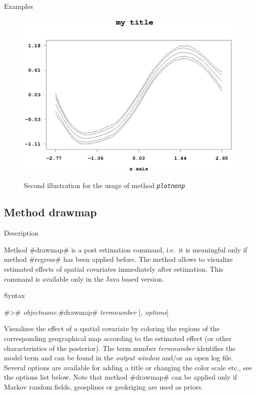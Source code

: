 \begin{stanza}{Examples}
\begin{figure}[p]
\begin{center}
\includegraphics[scale=0.8]{grafiken/plotnonpexample2.ps}
{\em\caption{ \label{plotnonpexample2} Second illustration for the
usage of method \em\tt plotnonp}}
\end{center}
\end{figure}

\end{stanza}

\clearpage

\subsection{Method drawmap} \label{drawmap}

\begin{stanza}{Description}

Method #drawmap# is a post estimation command, i.e.~it is
meaningful only if method #regress# has been applied before. The
method allows to visualize estimated effects of spatial covariates
immediately after estimation. This command is available only in
the Java based version.

\end{stanza}

\begin{stanza}{Syntax}

#># {\em objectname}.#drawmap# {\em termnumber} [{\em , options}]

Visualizes the effect of a spatial covariate by coloring the
regions of the corresponding geographical map according to the
estimated effect (or other characteristics of the posterior). The
term number {\em termnumber} identifies the model term and can be
found in the {\em output window} and/or an open log file. Several
options are available for adding a title or changing the color
scale etc., see the options list below. Note that method #drawmap#
can be applied only if Markov random fields, geosplines or
geokriging are used as priors.

\end{stanza}

